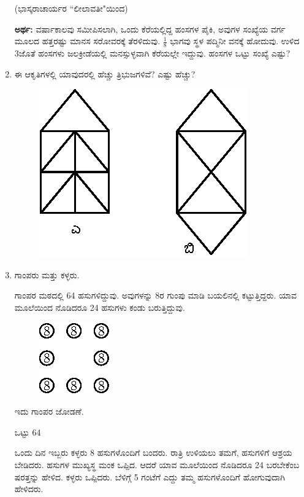 \begin{enumerate}
\smallskip

\hfill (ಭಾಸ್ಕರಾಚಾರ್ಯರ ``ಲೀಲಾವತೀ"ಯಿಂದ)


{\bf ಅರ್ಥ:} ವರ್ಷಾಕಾಲವು ಸಮೀಪಿಸಲಾಗಿ, ಒಂದು ಕೆರೆಯಲ್ಲಿದ್ದ ಹಂಸಗಳ ಪೈಕಿ, ಅವುಗಳ ಸಂಖ್ಯೆಯ ವರ್ಗ ಮೂಲದ ಹತ್ತರಷ್ಟು ಮಾನಸ ಸರೋವರಕ್ಕೆ ತೆರಳಿದುವು. $\frac{1}{8}$ ಭಾಗವು ಸ್ಥಳ ಪದ್ಮಿನೀ ವನಕ್ಕೆ ಹೋದುವು. ಉಳಿದ 3ಜೊತೆ ಹಂಸಗಳು ಜಲಕ್ರೀಡೆಯಲ್ಲಿ ಮನಸ್ಸುಳ್ಳವಾಗಿ ಕೆರೆಯಲ್ಲೇ ಇದ್ದುವು. ಹಂಸಗಳ ಒಟ್ಟು ಸಂಖ್ಯೆ ಎಷ್ಟು? 

\item ಈ ಆಕೃತಿಗಳಲ್ಲಿ ಯಾವುದರಲ್ಲಿ ಹೆಚ್ಚು ತ್ರಿಭುಜಗಳಿವೆ? ಎಷ್ಟು ಹೆಚ್ಚು?
\begin{figure}[H]
\centering
\includegraphics[scale=1.1]{images/chap12/q27.eps}
\end{figure}

\item ಗಾಂಪರು ಮತ್ತು ಕಳ್ಳರು. 

ಗಾಂಪರ ಮಠದಲ್ಲಿ 64 ಹಸುಗಳಿದ್ದುವು. ಅವುಗಳನ್ನು 8ರ ಗುಂಪು ಮಾಡಿ ಬಯಲಿನಲ್ಲಿ ಕಟ್ಟುತ್ತಿದ್ದರು. ಯಾವ ಮೂಲೆಯಿಂದ ನೊಡಿದರೂ 24 ಹಸುಗಳು ಕಂಡು ಬರುತ್ತಿದ್ದುವು. 
\begin{figure}[H]
\centering
\includegraphics{images/chap12/q28a.eps}
\end{figure}
ಇದು ಗಾಂಪರ ಜೋಡಣೆ.

ಒಟ್ಟು 64


ಒಂದು ದಿನ ಇಬ್ಬರು ಕಳ್ಳರು 8 ಹಸುಗಳೊಂದಿಗೆ ಬಂದರು. ರಾತ್ರಿ ಉಳಿಯಲು ತಮಗೆ, ಹಸುಗಳಿಗೆ ಆಶ್ರಯ ಬೇಡಿದರು. ಹಸುಗಳ ಮುಖ್ಯಸ್ಥ ಮಂಕ ಒಪ್ಪಿದ. ಆದರೆ ಯಾವ ಮೂಲೆಯಿಂದ ನೊಡಿದರೂ 24 ಬರಬೇಕೆಂಬ ಷರತ್ತನ್ನು ಹೇಳಿದ. ಕಳ್ಳರು ಒಪ್ಪಿದರು. ಬೆಳಿಗ್ಗೆ  5 ಗಂಟೆಗೆ ಎದ್ದು ತಮ್ಮ ಹಸುಗಳೊಂದಿಗೆ ಹೋಗುವುದಾಗಿ ಹೇಳಿದರು. 


\end{enumerate}
